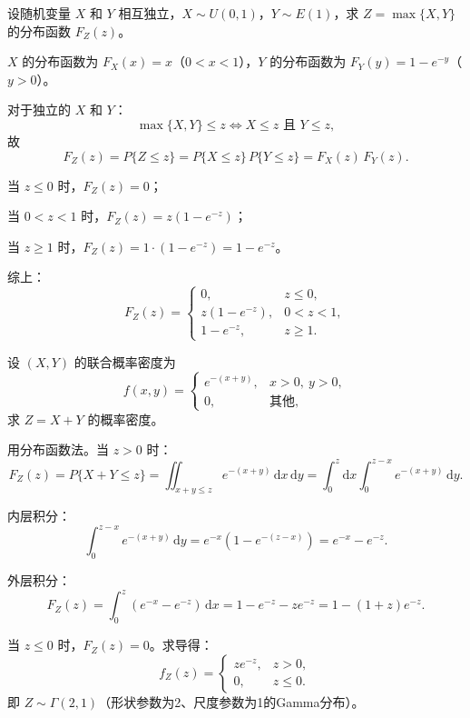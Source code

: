 \documentclass[lang=cn,11pt]{elegantbook}
\begin{document}
\begin{exercise}\label{exer:3-7}
设随机变量 $X$ 和 $Y$ 相互独立，$X \sim U(0, 1)$，$Y \sim E(1)$，求 $Z = \max\{X, Y\}$ 的分布函数 $F_Z(z)$。
\end{exercise}

\begin{solution}
$X$ 的分布函数为 $F_X(x) = x$（$0 < x < 1$），$Y$ 的分布函数为 $F_Y(y) = 1 - e^{-y}$（$y > 0$）。

对于独立的 $X$ 和 $Y$：
\[
\max\{X, Y\} \leqslant z \iff X \leqslant z \text{ 且 } Y \leqslant z,
\]
故
\[
F_Z(z) = P\{Z \leqslant z\} = P\{X \leqslant z\}\,P\{Y \leqslant z\} = F_X(z)\,F_Y(z).
\]

当 $z \leqslant 0$ 时，$F_Z(z) = 0$；

当 $0 < z < 1$ 时，$F_Z(z) = z(1 - e^{-z})$；

当 $z \geqslant 1$ 时，$F_Z(z) = 1 \cdot (1-e^{-z}) = 1 - e^{-z}$。

综上：
\[
F_Z(z) = \begin{cases} 0, & z \leqslant 0, \\ z(1 - e^{-z}), & 0 < z < 1, \\ 1 - e^{-z}, & z \geqslant 1. \end{cases}
\]
\end{solution}

\begin{exercise}\label{exer:3-8}
设 $(X,Y)$ 的联合概率密度为
\[
f(x,y) = \begin{cases} e^{-(x+y)}, & x > 0,\ y > 0, \\ 0, & \text{其他}, \end{cases}
\]
求 $Z = X + Y$ 的概率密度。
\end{exercise}

\begin{solution}
用分布函数法。当 $z > 0$ 时：
\[
F_Z(z) = P\{X+Y \leqslant z\} = \iint_{x+y \leqslant z}e^{-(x+y)}\,\mathrm{d}x\,\mathrm{d}y = \int_0^z\mathrm{d}x\int_0^{z-x}e^{-(x+y)}\,\mathrm{d}y.
\]

内层积分：
\[
\int_0^{z-x}e^{-(x+y)}\,\mathrm{d}y = e^{-x}(1-e^{-(z-x)}) = e^{-x} - e^{-z}.
\]

外层积分：
\[
F_Z(z) = \int_0^z(e^{-x} - e^{-z})\,\mathrm{d}x = 1 - e^{-z} - ze^{-z} = 1 - (1+z)e^{-z}.
\]

当 $z \leqslant 0$ 时，$F_Z(z) = 0$。求导得：
\[
f_Z(z) = \begin{cases} ze^{-z}, & z > 0, \\ 0, & z \leqslant 0. \end{cases}
\]
即 $Z \sim \Gamma(2, 1)$（形状参数为2、尺度参数为1的Gamma分布）。
\end{solution}
\end{document}
